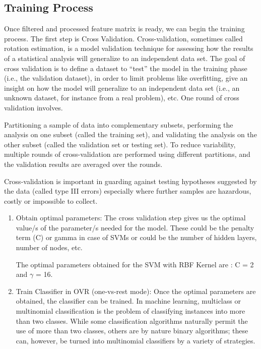 \documentclass[letterpaper,12pt, onecolumn]{article}%
\begin{document}
\subsection{Training Process}
Once filtered and processed feature matrix is ready, we can begin the training process. The first step is Cross Validation. Cross-validation, sometimes called rotation estimation, is a model validation technique for assessing how the results of a statistical analysis will generalize to an independent data set. The goal of cross validation is to define a dataset to \enquote{test} the model in the training phase (i.e., the validation dataset), in order to limit problems like overfitting, give an insight on how the model will generalize to an independent data set (i.e., an unknown dataset, for instance from a real problem), etc. One round of cross validation involves. 

Partitioning a sample of data into complementary subsets, performing the analysis on one subset (called the training set), and validating the analysis on the other subset (called the validation set or testing set). To reduce variability, multiple rounds of cross-validation are performed using different partitions, and the validation results are averaged over the rounds.

Cross-validation is important in guarding against testing hypotheses suggested by the data (called type III errors) especially where further samples are hazardous, costly or impossible to collect.

\begin{enumerate}
\item Obtain optimal parameters: The cross validation step gives us the optimal value/s of the parameter/s needed for the model. These could be the penalty term (C) or gamma in case of SVMs or could be the number of hidden layers, number of nodes, etc. 

The optimal parameters obtained for the SVM with RBF Kernel are :  C = 2 and $\gamma$ = 16.

\item Train Classifier in OVR (one-vs-rest mode): Once the optimal parameters are obtained, the classifier can be trained.
In machine learning, multiclass or multinomial classification is the problem of classifying instances into more than two classes. While some classification algorithms naturally permit the use of more than two classes, others are by nature binary algorithms; these can, however, be turned into multinomial classifiers by a variety of strategies.
\end{enumerate}
\end{document}
